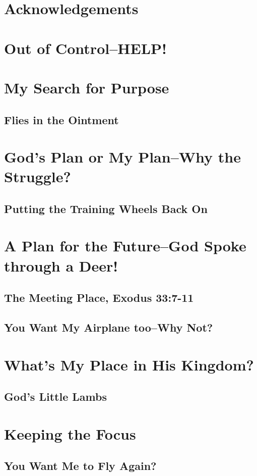 \documentclass[oneside]{book}
\begin{document}
\chapter{Acknowledgements}
\lipsum[1]
\clearpage
\tableofcontents
\clearpage
\mainmatter
\chapter{Out of Control--HELP!}

\chapter{My Search for Purpose}
\section{Flies in the Ointment}
\chapter{God's Plan or My Plan--Why the Struggle?}
\section{Putting the Training Wheels Back On}
\chapter{A Plan for the Future--God Spoke through a Deer!}
\section{The Meeting Place, Exodus 33:7-11}
\section{You Want My Airplane too--Why Not?}
\chapter{What's My Place in His Kingdom?}
\section{God's Little Lambs}
\chapter{Keeping the Focus}
\section{You Want Me to Fly Again?}
\end{document}
